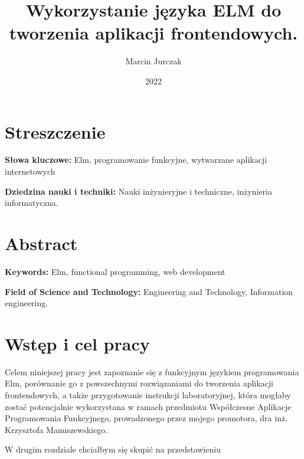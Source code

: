 \documentclass[twoside,a4paper]{report}
\begin{document}


\title{Wykorzystanie języka ELM do tworzenia aplikacji frontendowych.}
\author{Marcin Jurczak}
\date{2022}

\maketitle


\chapter*{Streszczenie}
\lipsum[1]

\textbf{Słowa kluczowe:} Elm, programowanie funkcyjne, wytwarzane aplikacji internetowych

\textbf{Dziedzina nauki i techniki: }Nauki inżynieryjne i techniczne, inżynieria informatyczna.

{\let\clearpage\relax\chapter*{Abstract}}
\lipsum[1]

\textbf{Keywords:} Elm, functional programming, web development

\textbf{Field of Science and Technology:} Engineering and Technology, Information engineering.

\tableofcontents


\chapter{Wstęp i cel pracy}

Celem niniejszej pracy jest zapoznanie się z funkcyjnym językiem programowania Elm, porównanie go z powszechnymi rozwiązaniami do tworzenia aplikacji frontendowych, a także przygotowanie instrukcji laboratoryjnej, która mogłaby zostać potencjalnie wykorzystana w ramach przedmiotu Współczesne Aplikacje Programowania Funkcyjnego, prowadzonego przez mojego promotora, dra inż. Krzysztofa Manuszewskiego.

W drugim rozdziale chciałbym się skupić na przedstawieniu
\end{document}
